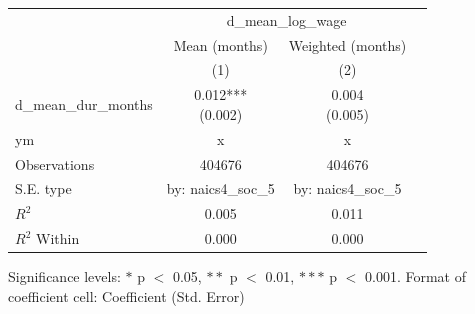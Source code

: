 \renewcommand\cellalign{t}
\begin{threeparttable}
\begin{tabular}{lccc}
\toprule
 & \multicolumn{2}{c}{d_mean_log_wage} \\
\cmidrule(lr){2-3} 
 & Mean (months) & Weighted (months) \\
 & (1) & (2) \\
\midrule
\addlinespace
d_mean_dur_months & \makecell{0.012*** \\ (0.002)} & \makecell{0.004 \\ (0.005)} \\
\midrule
\addlinespace
ym & x & x \\
\midrule
\addlinespace
Observations & 404676 & 404676 \\
S.E. type & by: naics4_soc_5 & by: naics4_soc_5 \\
$R^2$ & 0.005 & 0.011 \\
$R^2$ Within & 0.000 & 0.000 \\
\bottomrule
\end{tabular}
\footnotesize Significance levels: $*$ p $<$ 0.05, $**$ p $<$ 0.01, $***$ p $<$ 0.001. Format of coefficient cell: Coefficient 
 (Std. Error)
\end{threeparttable}